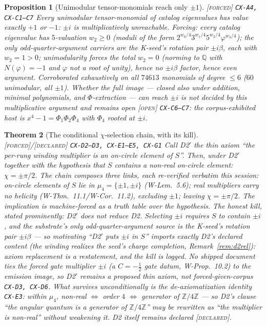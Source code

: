 \documentclass[11pt]{article}
\newcommand{\tagF}{\textcolor{cF}{\textsc{[forced]}}}
\newcommand{\tagD}{\textcolor{cD}{\textsc{[declared]}}}
\newcommand{\tagO}{\textcolor{cO}{\textsc{[open]}}}
\newcommand{\hx}[1]{\textcolor{cC}{\footnotesize\texttt{#1}}}
\newcommand{\Q}{\mathbb{Q}}
\newcommand{\Z}{\mathbb{Z}}
\newcommand{\gp}{\varphi}
\theoremstyle{plain}
\newtheorem{theorem}{Theorem}[section]
\newtheorem{proposition}[theorem]{Proposition}
\theoremstyle{definition}
\theoremstyle{remark}
\begin{document}
\begin{proposition}[Unimodular tensor-monomials reach only $\pm1$]\label{prop:unimon}\tagF{} \hx{CX-A4, CX-C1--C7}
Every unimodular tensor-monomial of catalog eigenvalues has value exactly
$+1$ or $-1$: $\pm i$ is multiplicatively unreachable. Forcing: every
catalog eigenvalue has $5$-valuation $w_2\ge0$ (moduli of the form
$2^{w_0/4}3^{w_1/4}5^{w_2/4}\gp^{w_3/4}$); the only odd-quarter-argument
carriers are the K-seed's rotation pair $\pm i\beta$, each with $w_2=1>0$;
unimodularity forces the total $w_2=0$ (norming to $\Q$ with $N(\gp)=-1$
and $\gp$ not a root of unity), hence no $\pm i\beta$ factor, hence even
argument. Corroborated exhaustively on all $74613$ monomials of degree
$\le6$ ($60$ unimodular, all $\pm1$). Whether the \emph{full} image ---
closed also under addition, minimal polynomials, and $\Phi$-extraction ---
can reach $\pm i$ is \emph{not} decided by this multiplicative argument and
remains open \tagO{} \hx{CX-C6--C7}: the corpus-exhibited host is
$x^4-1=\Phi_1\Phi_2\Phi_4$ with $\Phi_4$ rooted at $\pm i$.
\end{proposition}

\begin{theorem}[The conditional $\chi$-selection chain, with its kill]\label{thm:chichain}\tagF{}/\tagD{} \hx{CX-D2--D3, CX-E1--E5, CX-G1}
Call D2$'$ the thin axiom \emph{``the per-rung winding multiplier is an
on-circle element of $S$''}. Then, \emph{under D2$'$ together with the
hypothesis that $S$ contains a non-real on-circle element}:
$\chi=\pm\pi/2$. The chain composes three links, each re-verified verbatim
this session: on-circle elements of $S$ lie in $\mu_4=\{\pm1,\pm i\}$
(W-Lem.\ 5.6); real multipliers carry no helicity
(W-Thm.\ 11.1/W-Cor.\ 11.2), excluding $\pm1$; leaving $\chi=\pm\pi/2$. The
implication is machine-forced as a truth table over the hypothesis.
\emph{The honest kill, stated prominently:} D2$'$ does \emph{not} reduce
D2. Selecting $\pm i$ requires $S$ to contain $\pm i$, and the substrate's
only odd-quarter-argument source is the K-seed's rotation pair $\pm i\beta$
--- so motivating ``D2$'$ puts $\pm i$ in $S$'' imports exactly D2's
declared content (the winding realizes the seed's charge completion,
Remark~\ref{rem:d2rel}): axiom replacement is a \emph{restatement}, and the
kill is logged. No shipped document ties the forced \emph{gate} multiplier
$\pm i$ (a $C=-\tfrac12$ gate datum, W-Prop.\ 10.2) to the emission image,
so D2$'$ remains a proposed thin axiom, not forced-given-corpus
\hx{CX-D3, CX-D6}. What survives unconditionally is the
\emph{de-axiomatization identity} \hx{CX-E3}: within $\mu_4$, non-real
$\iff$ order $4$ $\iff$ generator of $\Z/4\Z$ --- so D2's clause ``the
angular quantum is a generator of $\Z/4\Z$'' may be rewritten as ``the
multiplier is non-real'' without weakening it. D2 itself remains declared
\tagD{}.
\end{theorem}
\end{document}

